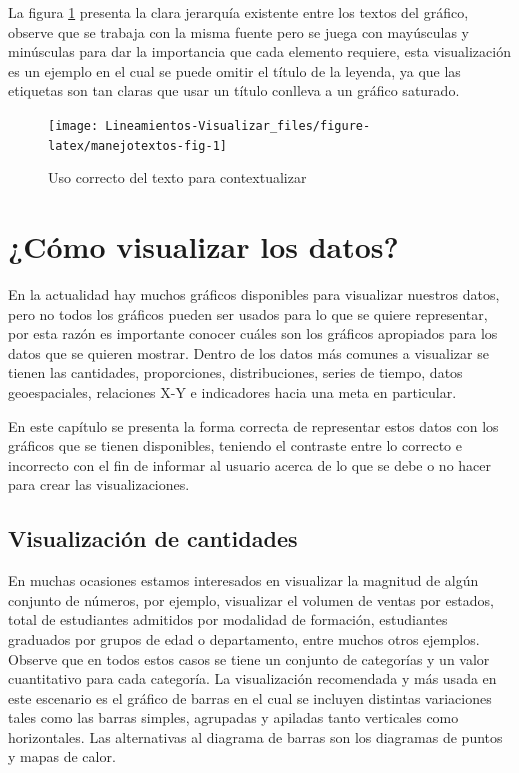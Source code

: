 \documentclass[
]{book}
\begin{document}
La figura \ref{fig:manejotextos-fig} presenta la clara jerarquía existente entre los textos del gráfico, observe que se trabaja con la misma fuente pero se juega con mayúsculas y minúsculas para dar la importancia que cada elemento requiere, esta visualización es un ejemplo en el cual se puede omitir el título de la leyenda, ya que las etiquetas son tan claras que usar un título conlleva a un gráfico saturado.

\begin{figure}

{\centering \texttt{[image: Lineamientos-Visualizar\_files/figure-latex/manejotextos-fig-1]} 

}

\caption{Uso correcto del texto para contextualizar}\label{fig:manejotextos-fig}
\end{figure}

\hypertarget{cuxf3mo-visualizar-los-datos}{%
\chapter{¿Cómo visualizar los datos?}\label{cuxf3mo-visualizar-los-datos}}

En la actualidad hay muchos gráficos disponibles para visualizar nuestros datos, pero no todos los gráficos pueden ser usados para lo que se quiere representar, por esta razón es importante conocer cuáles son los gráficos apropiados para los datos que se quieren mostrar. Dentro de los datos más comunes a visualizar se tienen las cantidades, proporciones, distribuciones, series de tiempo, datos geoespaciales, relaciones X-Y e indicadores hacia una meta en particular.

En este capítulo se presenta la forma correcta de representar estos datos con los gráficos que se tienen disponibles, teniendo el contraste entre lo correcto e incorrecto con el fin de informar al usuario acerca de lo que se debe o no hacer para crear las visualizaciones.

\hypertarget{cantidades}{%
\section{Visualización de cantidades}\label{cantidades}}

En muchas ocasiones estamos interesados en visualizar la magnitud de algún conjunto de números, por ejemplo, visualizar el volumen de ventas por estados, total de estudiantes admitidos por modalidad de formación, estudiantes graduados por grupos de edad o departamento, entre muchos otros ejemplos. Observe que en todos estos casos se tiene un conjunto de categorías y un valor cuantitativo para cada categoría. La visualización recomendada y más usada en este escenario es el gráfico de barras en el cual se incluyen distintas variaciones tales como las barras simples, agrupadas y apiladas tanto verticales como horizontales. Las alternativas al diagrama de barras son los diagramas de puntos y mapas de calor.
\end{document}

